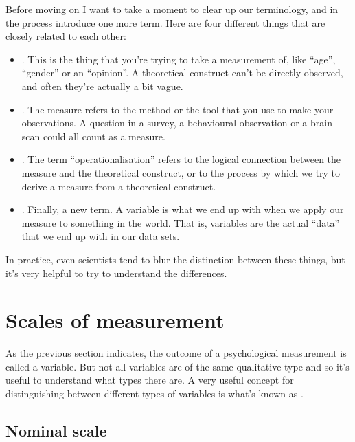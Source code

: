 Before moving on I want to take a moment to clear up our terminology, and in the process introduce one more term. Here are four different things that are closely related to each other:

\begin{itemize}
\item {}. This is the thing that you're trying to take a measurement of, like ``age'', ``gender'' or an ``opinion''. A theoretical construct can't be directly observed, and often they're actually a bit vague. 
\item {}. The measure refers to the method or the tool that you use to make your observations. A question in a survey, a behavioural observation or a brain scan could all count as a measure. 
\item {}. The term ``operationalisation'' refers to the logical connection between the measure and the theoretical construct, or to the process by which we try to derive a measure from a theoretical construct.
\item {}. Finally, a new term. A variable is what we end up with when we apply our measure to something in the world. That is, variables are the actual ``data'' that we end up with in our data sets.
\end{itemize}

\noindent
In practice, even scientists tend to blur the distinction between these things, but it's very helpful to try to understand the differences.

\section{Scales of measurement\label{sec:scales}}

As the previous section indicates, the outcome of a psychological measurement is called a  variable. But not all variables are of the same qualitative type and so it's useful to understand what types there are. A very useful concept for distinguishing between different types of variables is what's known as . 


\subsection{Nominal scale}

